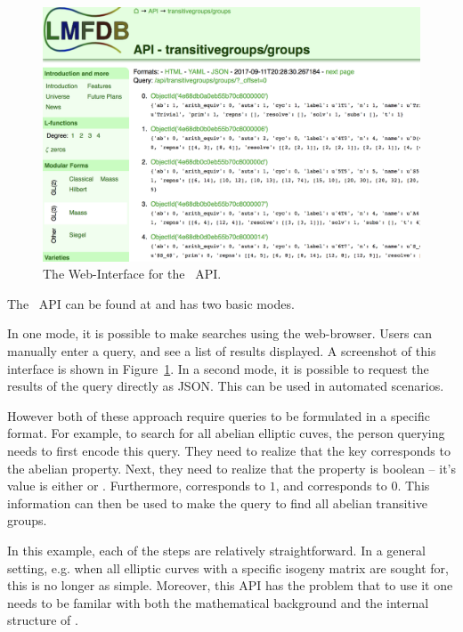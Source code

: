 \begin{figure}[h]
  \begin{center}
    \includegraphics[width=\textwidth]{APIScreenshot.png}
  \end{center}

  \caption[The Web-Interface for the \lmfdb\ API. ]{
    The Web-Interface for the \lmfdb\ API. 
  }
  \label{fig:apiscreenshot}
\end{figure}
The \lmfdb\ API can be found at  and has two basic modes. 

In one mode, it is possible to make searches using the web-browser. 
Users can manually enter a query, and see a list of results displayed. 
A screenshot of this interface is shown in Figure~\ref{fig:apiscreenshot}. 
In a second mode, it is possible to request the results of the query directly as JSON. 
This can be used in automated scenarios. 

However both of these approach require queries to be formulated in a specific format.
For example, to search for all abelian elliptic cuves, the person querying \lmfdb needs to first encode this query. 
They need to realize that the  key corresponds to the abelian property. 
Next, they need to realize that the property is boolean -- it's value is either  or . 
Furthermore,  corresponds to $1$, and  corresponds to $0$. 
This information can then be used to make the query  to find all abelian transitive groups. 

In this example, each of the steps are relatively straightforward. 
In a general setting, e.g. when all elliptic curves with a specific isogeny matrix are sought for, this is no longer as simple. 
Moreover, this API has the problem that to use it one needs to be familar with both the mathematical background and the internal structure of \lmfdb. 

